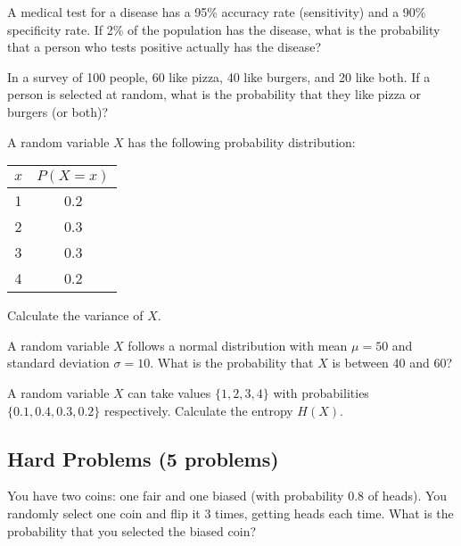 \begin{problem}
A medical test for a disease has a 95\% accuracy rate (sensitivity) and a 90\% specificity rate. If 2\% of the population has the disease, what is the probability that a person who tests positive actually has the disease?
\end{problem}

\begin{problem}
In a survey of 100 people, 60 like pizza, 40 like burgers, and 20 like both. If a person is selected at random, what is the probability that they like pizza or burgers (or both)?
\end{problem}

\begin{problem}
A random variable $X$ has the following probability distribution:
\begin{center}
\begin{tabular}{|c|c|}
\hline
$x$ & $P(X=x)$ \\
\hline
1 & 0.2 \\
2 & 0.3 \\
3 & 0.3 \\
4 & 0.2 \\
\hline
\end{tabular}
\end{center}
Calculate the variance of $X$.
\end{problem}

\begin{problem}
A random variable $X$ follows a normal distribution with mean $\mu = 50$ and standard deviation $\sigma = 10$. What is the probability that $X$ is between 40 and 60?
\end{problem}

\begin{problem}
A random variable $X$ can take values $\{1, 2, 3, 4\}$ with probabilities $\{0.1, 0.4, 0.3, 0.2\}$ respectively. Calculate the entropy $H(X)$.
\end{problem}

\subsection{Hard Problems (5 problems)}

\begin{problem}
You have two coins: one fair and one biased (with probability 0.8 of heads). You randomly select one coin and flip it 3 times, getting heads each time. What is the probability that you selected the biased coin?
\end{problem}

